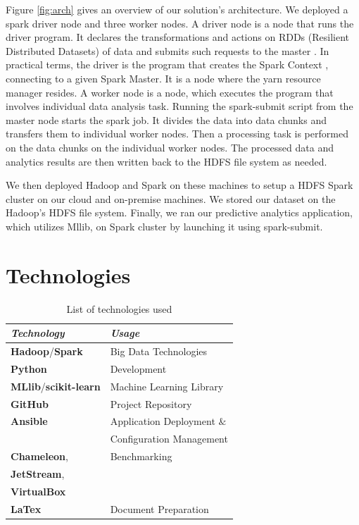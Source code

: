 \documentclass[9pt,twocolumn,twoside]{../../styles/osajnl}
\begin{document}
Figure \ref{fig:arch} gives an overview of our solution’s architecture. We deployed a spark driver node and three worker nodes. A driver node is a node that runs the driver program. It declares the transformations and actions on RDDs (Resilient Distributed Datasets) of data and submits such requests to the master \cite{www-rdd}. In practical terms, the driver is the program that creates the Spark Context \cite{www-sparkcontext}, connecting to a given Spark Master. It is a node where the yarn resource manager resides. A worker node is a node, which executes the program that involves individual data analysis task.
Running the spark-submit script from the master node starts the spark job. It divides the data into data chunks and transfers them to individual worker nodes. Then a processing task is performed on the data chunks on the individual worker nodes. The processed data and analytics results are then written back to the HDFS file system as needed.

We then deployed Hadoop and Spark on these machines to setup a HDFS Spark cluster on our cloud and on-premise machines. We stored our dataset on the Hadoop’s HDFS file system. Finally, we ran our predictive analytics application, which utilizes Mllib, on Spark cluster by launching it using spark-submit.

\section{Technologies}
\begin{table}[h!]
\centering
 \caption{List of technologies used}
 \begin{tabular}[width=\linewidth]{|l l|}
 \hline
 \textit{Technology} & \textit{Usage}  \\  \hline
 \hline 
 \textbf{Hadoop}\cite{www-hadoop}/\textbf{Spark} \cite{www-spark} & Big Data Technologies  \\
 \hline
 \textbf{Python}\cite{www-python} & Development \\
  \hline
 \textbf{MLlib}\cite{www-mllib}/\textbf{scikit-learn}\cite{www-sklearn} & Machine Learning Library \\
 \hline
 \textbf{GitHub}\cite{www-github} & Project Repository \\
 \hline
 \textbf{Ansible}\cite{www-ansible} & Application Deployment $\&$\\ & Configuration Management \\
 \hline
 \textbf{Chameleon}\cite{www-chameleon}, & Benchmarking \\
 \textbf{JetStream}\cite{www-jetstream}, & \\
 \textbf{VirtualBox}\cite{www-vm} &\\
 \hline
 \textbf{LaTex} \cite{www-latex} & Document Preparation \\
 \hline
\end{tabular}
\label{table:techlist}
\end{table}
\end{document}
